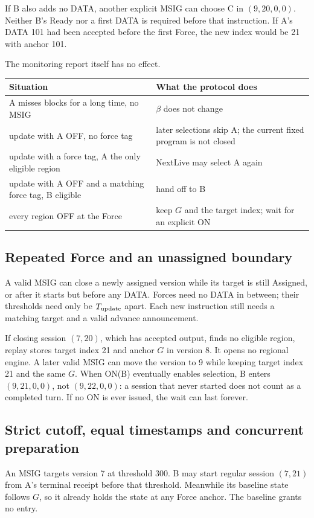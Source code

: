 \documentclass[11pt,a4paper]{article}
\newcounter{protocol}
\begin{document}
If B also adds no DATA, another explicit MSIG can choose C in
$(9,20,0,0)$. Neither B's Ready nor a first DATA is required before that
instruction. If A's DATA 101 had been accepted before the first Force,
the new index would be 21 with anchor 101.

The monitoring report itself has no effect.
\begin{center}\small
\begin{tabularx}{\linewidth}{@{}>{\raggedright\arraybackslash}p{.45\linewidth}Y@{}}\toprule
Situation & What the protocol does\\\midrule
A misses blocks for a long time, no MSIG & $\beta$ does not change\\
update with A OFF, no force tag & later selections skip A; the current fixed program is not closed\\
update with a force tag, A the only eligible region & NextLive may select A again\\
update with A OFF and a matching force tag, B eligible & hand off to B\\
every region OFF at the Force & keep $G$ and the target index; wait for an explicit ON\\\bottomrule
\end{tabularx}
\end{center}

\subsection{Repeated Force and an unassigned boundary}
\label{sec:repeated-force}
A valid MSIG can close a newly assigned version while its target is
still Assigned, or after it starts but before any DATA. Forces need no DATA
in between; their thresholds need only be $T_{\rm update}$ apart. Each
new instruction still needs a matching
target and a valid advance announcement.

If closing session $(7,20)$, which has accepted output, finds no eligible
region, replay stores target index 21 and anchor $G$ in version 8. It
opens no regional engine. A later valid MSIG can move the version to 9
while keeping target index 21 and the same $G$. When ON(B) eventually
enables selection, B enters $(9,21,0,0)$, not $(9,22,0,0)$: a session
that never started does not count as a completed turn. If no ON is ever
issued, the wait can last forever.

\subsection{Strict cutoff, equal timestamps and concurrent preparation}
\label{sec:cutoff-example}
An MSIG targets version 7 at threshold 300. B may start regular session
$(7,21)$ from A's terminal receipt before that threshold. Meanwhile its
baseline state follows $G$, so it already holds the state at any Force
anchor. The baseline grants no entry.
\end{document}
